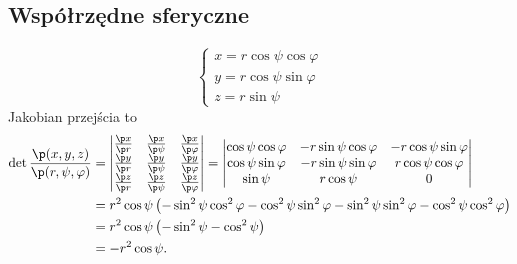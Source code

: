 \subsection*{Współrzędne sferyczne}
\begin{equation} \begin{cases}
    x = r \cos\psi \cos\varphi \\
    y = r \cos\psi \sin\varphi \\
    z = r \sin\psi
\end{cases} \end{equation}
Jakobian przejścia to
\begin{align*}
    \det \frac{\p (x, y, z)}{\p (r, \psi, \varphi)} &= \begin{vmatrix}
        \frac{\p x}{\p r} & \frac{\p x}{\p \psi} & \frac{\p x}{\p \varphi} \\
        \frac{\p y}{\p r} & \frac{\p y}{\p \psi} & \frac{\p y}{\p \varphi} \\
        \frac{\p z}{\p r} & \frac{\p z}{\p \psi} & \frac{\p z}{\p \varphi}
    \end{vmatrix} = \begin{vmatrix}
        \cos\psi \cos\varphi & -r \sin\psi \cos\varphi & -r \cos\psi \sin\varphi \\
        \cos\psi \sin\varphi & -r \sin\psi \sin\varphi & r \cos\psi \cos\varphi \\
        \sin\psi & r \cos\psi & 0
    \end{vmatrix} \\
    &= r^2\cos\psi\left(-\sin^2\psi\cos^2\varphi - \cos^2\psi\sin^2\varphi - \sin^2\psi\sin^2\varphi - \cos^2\psi\cos^2\varphi\right) \\
    &= r^2\cos\psi\left(-\sin^2\psi - \cos^2\psi\right) \\
    &= -r^2\cos\psi.
\end{align*}
